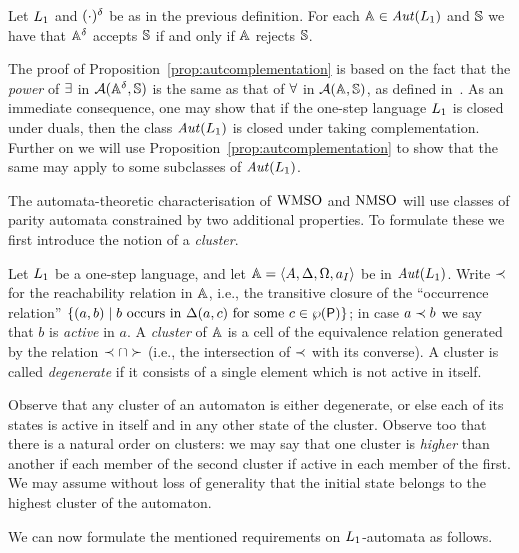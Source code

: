 \begin{proposition}
\label{prop:autcomplementation}
Let $L_{1}$ and $(\cdot)^{\delta}$ be as in the previous definition.
For each $\mathbb{A} \in \mathit{Aut}(L_{1})$ and $\mathbb{S}$ we have that $\mathbb{A}^{\delta}$ accepts
$\mathbb{S}$ if and only if $\mathbb{A}$ rejects $\mathbb{S}$.
\end{proposition}

The proof of Proposition~\ref{prop:autcomplementation} is based on the fact
that the \emph{power} of $\exists$ in $\mathcal{A}(\mathbb{A}^{\delta},\mathbb{S})$ is the same
as that of $\forall$ in $\mathcal{A}(\mathbb{A},\mathbb{S})$, as defined 
in~\cite{DBLP:conf/calco/KissigV09}. 
As an immediate consequence, one may show that if the one-step language 
$L_{1}$ is closed under duals, then the class $\mathit{Aut}(L_{1})$ is closed 
under taking complementation.
Further on we will use Proposition~\ref{prop:autcomplementation} to show that
the same may apply to some subclasses of $\mathit{Aut}(L_{1})$.

The automata-theoretic characterisation of $\mathrm{WMSO}$ and $\mathrm{NMSO}$ will use classes 
of parity automata constrained by two additional properties.
To formulate these we first introduce the notion of a \emph{cluster}.

\begin{definition}
Let $L_{1}$ be a one-step language, and let $\mathbb{A} = \langle{A,\Delta,\Omega,a_I}\rangle$
be in $\mathit{Aut}(L_{1})$. 
Write $\prec$ for the reachability relation in $\mathbb{A}$, i.e., the transitive 
closure of the ``occurrence relation'' $\{ (a,b) \mid b \text{ occurs in }
\tmap(a,c) \text{ for some } c \in \pow(\pprop) \}$;
in case $a \prec b$ we say that $b$ is \emph{active} in $a$.
A \emph{cluster} of $\mathbb{A}$ is a cell of the equivalence relation generated by 
the relation $\prec \cap \succ$ (i.e., the intersection of $\prec$ with its 
converse).
A cluster is called \emph{degenerate} if it consists of a  single element which
is not active in itself.
\end{definition}

Observe that any cluster of an automaton is either degenerate, or else each
of its states is active in itself and in any other state of the cluster.
Observe too that there is a natural order on clusters: we may say that one
cluster is \emph{higher} than another if each member of the second cluster
if active in each member of the first.
We may assume without loss of generality that the initial state belongs to the
highest cluster of the automaton.

We can now formulate the mentioned requirements on $L_{1}$-automata as follows.

